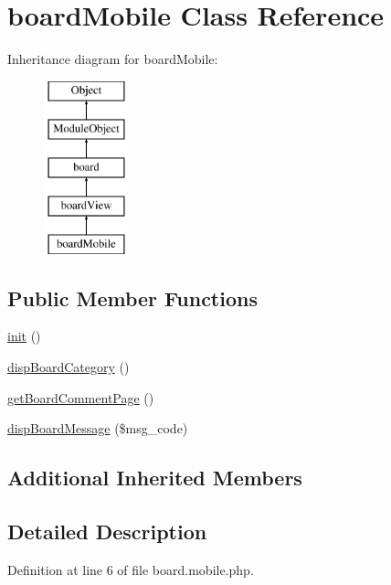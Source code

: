 \hypertarget{classboardMobile}{}\section{board\+Mobile Class Reference}
\label{classboardMobile}
Inheritance diagram for board\+Mobile\+:\begin{figure}[H]
\begin{center}
\leavevmode
\includegraphics[height=5.000000cm]{classboardMobile}
\end{center}
\end{figure}
\subsection*{Public Member Functions}
\begin{DoxyCompactItemize}
\item 
\hyperlink{classboardMobile_ab403b1f5b76033b26e461fc483c2216b}{init} ()
\item 
\hyperlink{classboardMobile_a8a6e7bb91059739116011375cf62ff91}{disp\+Board\+Category} ()
\item 
\hyperlink{classboardMobile_a023ac488f13a61b76acf5a22c1a64e8a}{get\+Board\+Comment\+Page} ()
\item 
\hyperlink{classboardMobile_aa25065243c3bfab1ef936b7db897a527}{disp\+Board\+Message} (\$msg\+\_\+code)
\end{DoxyCompactItemize}
\subsection*{Additional Inherited Members}


\subsection{Detailed Description}


Definition at line 6 of file board.\+mobile.\+php.



